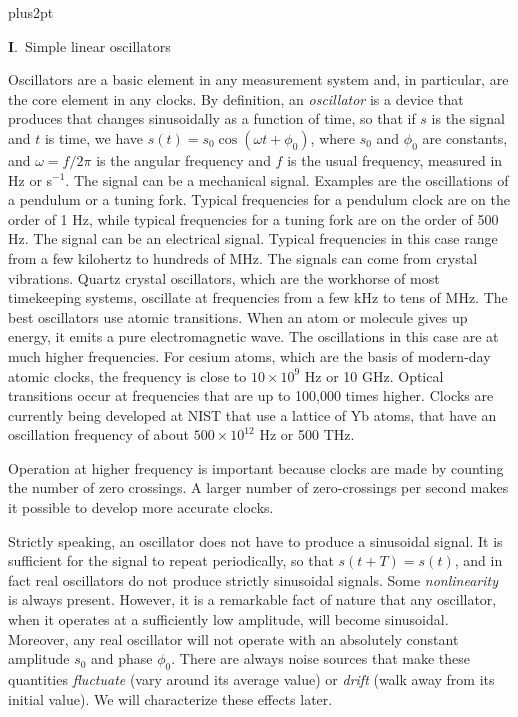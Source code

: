 \baselineskip14pt \parskip4pt plus2pt
 \def\hI{\hbox{I}} 
 \def\cc{\hbox{c.c.}}
 \def\cC{{\cal C}}  
 \def\cL{{\cal L}}
 \def\tx{\tilde x}
 \def\tJ{\tilde J} 
 \def\tI{\tilde I}  
 \def\tV{\tilde V}
 \def\xi{x_{rm i}}  
 \def\vi{v_{\rm i}}
 
\centerline{\large\textbf I.~Simple linear oscillators}\bigskip
 

Oscillators are a basic element in any measurement system and, in
particular, are the core element in any clocks.  By definition, an
{\it oscillator} is a device that produces that changes sinusoidally
as a function of time, so that if $s$ is the signal and $t$ is time, we
have $s(t) = s_0\cos(\omega t + \phi_0)$, where $s_0$ and $\phi_0$ are
constants, and $\omega=f/2\pi$ is the angular frequency and $f$ is the
usual frequency, measured in Hz or s$^{-1}$.  The signal can be a mechanical 
signal.  Examples are the oscillations of a pendulum or a tuning fork.  
Typical frequencies for a pendulum clock are on the order of 1 Hz, while
typical frequencies for a tuning fork are on the order of 500 Hz.
The signal can be an electrical signal.  Typical frequencies in this case
range from a few kilohertz to hundreds of MHz.  The signals can come from 
crystal vibrations.  Quartz crystal oscillators, which are the workhorse 
of most timekeeping systems, oscillate at frequencies from a few kHz to
tens of MHz.  The best oscillators use atomic transitions.  When an atom
or molecule gives up energy, it emits a pure electromagnetic wave.  The
oscillations in this case are at much higher frequencies.  For cesium
atoms, which are the basis of modern-day atomic clocks, the frequency
is close to $10\times10^9$ Hz or 10 GHz.  Optical transitions occur at
frequencies that are up to 100,000 times higher.  Clocks are currently
being developed at NIST that use a lattice of Yb atoms, that have an
oscillation frequency of about $500\times10^{12}$ Hz or 500 THz.

Operation at higher frequency is important because clocks are made by
counting the number of zero crossings.  A larger number of zero-crossings
per second makes it possible to develop more accurate clocks.

Strictly speaking, an oscillator does not have to produce a sinusoidal
signal.  It is sufficient for the signal to repeat periodically, so that
$s(t+T) = s(t)$, and in fact real oscillators do not produce strictly
sinusoidal signals.  Some {\it nonlinearity} is always present.  However, it 
is a remarkable fact of nature that any oscillator, when it operates at a
sufficiently low amplitude, will become sinusoidal.  Moreover, any real
oscillator will not operate with an absolutely constant amplitude $s_0$
and phase $\phi_0$.  There are always noise sources that make these
quantities {\it fluctuate} (vary around its average value) or {\it drift}
(walk away from its initial value).  We will characterize these effects
later.

